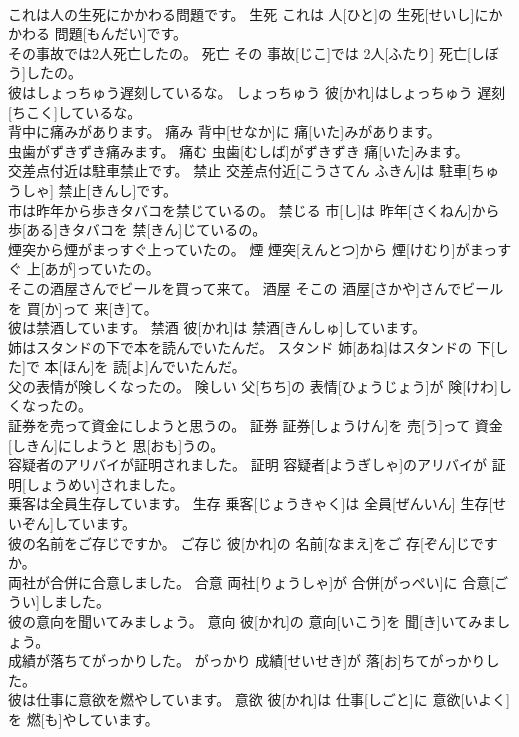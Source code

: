 \documentclass[8pt]{extreport}
\begin{document}
\begin{CJK}{UTF8}{min}
\\	これは人の生死にかかわる問題です。	生死	これは 人[ひと]の 生死[せいし]にかかわる 問題[もんだい]です。	
\\	その事故では2人死亡したの。	死亡	その 事故[じこ]では 2人[ふたり] 死亡[しぼう]したの。	
\\	彼はしょっちゅう遅刻しているな。	しょっちゅう	彼[かれ]はしょっちゅう 遅刻[ちこく]しているな。	
\\	背中に痛みがあります。	痛み	背中[せなか]に 痛[いた]みがあります。	
\\	虫歯がずきずき痛みます。	痛む	虫歯[むしば]がずきずき 痛[いた]みます。	
\\	交差点付近は駐車禁止です。	禁止	交差点付近[こうさてん ふきん]は 駐車[ちゅうしゃ] 禁止[きんし]です。	
\\	市は昨年から歩きタバコを禁じているの。	禁じる	市[し]は 昨年[さくねん]から 歩[ある]きタバコを 禁[きん]じているの。	
\\	煙突から煙がまっすぐ上っていたの。	煙	煙突[えんとつ]から 煙[けむり]がまっすぐ 上[あが]っていたの。	
\\	そこの酒屋さんでビールを買って来て。	酒屋	そこの 酒屋[さかや]さんでビールを 買[か]って 来[き]て。	
\\	彼は禁酒しています。	禁酒	彼[かれ]は 禁酒[きんしゅ]しています。	
\\	姉はスタンドの下で本を読んでいたんだ。	スタンド	姉[あね]はスタンドの 下[した]で 本[ほん]を 読[よ]んでいたんだ。	
\\	父の表情が険しくなったの。	険しい	父[ちち]の 表情[ひょうじょう]が 険[けわ]しくなったの。	
\\	証券を売って資金にしようと思うの。	証券	証券[しょうけん]を 売[う]って 資金[しきん]にしようと 思[おも]うの。	
\\	容疑者のアリバイが証明されました。	証明	容疑者[ようぎしゃ]のアリバイが 証明[しょうめい]されました。	
\\	乗客は全員生存しています。	生存	乗客[じょうきゃく]は 全員[ぜんいん] 生存[せいぞん]しています。	
\\	彼の名前をご存じですか。	ご存じ	彼[かれ]の 名前[なまえ]をご 存[ぞん]じですか。	
\\	両社が合併に合意しました。	合意	両社[りょうしゃ]が 合併[がっぺい]に 合意[ごうい]しました。	
\\	彼の意向を聞いてみましょう。	意向	彼[かれ]の 意向[いこう]を 聞[き]いてみましょう。	
\\	成績が落ちてがっかりした。	がっかり	成績[せいせき]が 落[お]ちてがっかりした。	
\\	彼は仕事に意欲を燃やしています。	意欲	彼[かれ]は 仕事[しごと]に 意欲[いよく]を 燃[も]やしています。	

\end{CJK}
\end{document}
